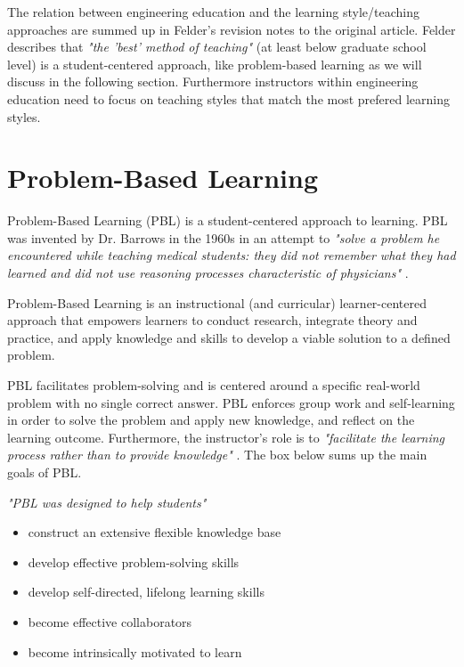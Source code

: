 \noindent
The relation between engineering education and the learning style/teaching approaches are summed up in Felder's revision notes to the original article. Felder describes that \textit{"the 'best' method of teaching"} (at least below graduate school level) \cite{Felder88k.:learning} is a student-centered approach, like problem-based learning as we will discuss in the following section. Furthermore instructors within engineering education need to focus on teaching styles that match the most prefered learning styles.


\section{Problem-Based Learning}

Problem-Based Learning (PBL) is a student-centered approach to learning. PBL was invented by Dr. Barrows in the 1960s in an attempt to \textit{"solve a problem he encountered while teaching medical students: they did not remember what they had learned and did not use reasoning processes characteristic of physicians"} \cite[p. 1]{walker2015essential}. 

\begin{definition} 
Problem-Based Learning is an instructional (and curricular) learner-centered approach that empowers learners to conduct research, integrate theory and practice, and apply knowledge and skills to develop a viable solution to a defined problem. \cite[p. 7]{walker2015essential}
\end{definition}

\noindent
PBL facilitates problem-solving and is centered around a specific real-world problem with no single correct answer. PBL enforces group work and self-learning in order to solve the problem and apply new knowledge, and reflect on the learning outcome. Furthermore, the instructor's role is to \textit{"facilitate the learning process rather than to provide knowledge"} \cite[p. 235]{hmelo2004pbl}. The box below sums up the main goals of PBL.

\begin{kasse} 
\textit{"PBL was designed to help students"} \cite[p. 240]{hmelo2004pbl}
\begin{itemize}
  \setlength\itemsep{0.05em}
  \item construct an extensive flexible knowledge base
  \item develop effective problem-solving skills
  \item develop self-directed, lifelong learning skills
  \item become effective collaborators
  \item become intrinsically motivated to learn
\end{itemize}

\end{kasse}

